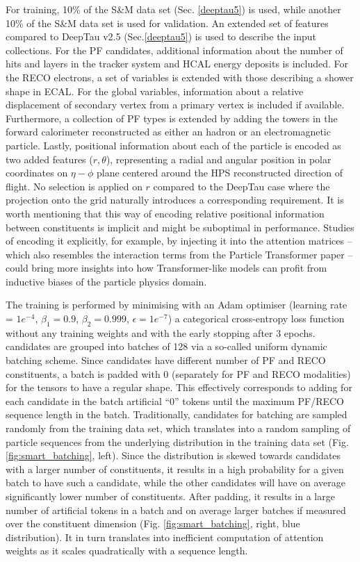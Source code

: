 For training, 10\% of the S\&M data set (Sec. \ref{deeptau5}) is used, while another 10\% of the S\&M data set is used for validation. An extended set of features compared to DeepTau v2.5 (Sec.\ref{deeptau5}) is used to describe the input collections. For the PF candidates, additional information about the number of hits and layers in the tracker system and HCAL energy deposits is included. For the RECO electrons, a set of variables is extended with those describing a shower shape in ECAL. For the global variables, information about a relative displacement of secondary vertex from a primary vertex is included if available.  Furthermore, a collection of PF types is extended by adding the towers in the forward calorimeter reconstructed as either an hadron or an electromagnetic particle. Lastly, positional information about each of the particle is encoded as two added features ($r, \theta$), representing a radial and angular position in polar coordinates on $\eta-\phi$ plane centered around the HPS reconstructed \tauh direction of flight. No selection is applied on $r$ compared to the DeepTau case where the projection onto the grid naturally introduces a corresponding requirement. It is worth mentioning that this way of encoding relative positional information between constituents is implicit and might be suboptimal in performance. Studies of encoding it explicitly, for example, by injecting it into the attention matrices \cite{chen2021demystifying}  -- which also resembles the interaction terms from the Particle Transformer paper -- could bring more insights into how Transformer-like models can profit from inductive biases of the particle physics domain.

The training is performed by minimising with an Adam optimiser (learning rate = $1e^{-4}$, $\beta_1=0.9$, $\beta_2=0.999$, $\epsilon=1e^{-7}$) a categorical cross-entropy loss function without any training weights and with the early stopping after 3 epochs. \tauh candidates are grouped into batches of 128 via a so-called uniform dynamic batching scheme. Since \tauh candidates have different number of PF and RECO constituents, a batch is padded with 0 (separately for PF and RECO modalities) for the tensors to have a regular shape. This effectively corresponds to adding for each \tauh candidate in the batch artificial \enquote{0} tokens until the maximum PF/RECO sequence length in the batch. Traditionally, \tauh candidates for batching are sampled randomly from the training data set, which translates into a random sampling of particle sequences from the underlying distribution in the training data set (Fig. \ref{fig:smart_batching}, left). Since the distribution is skewed towards \tauh candidates with a larger number of constituents, it results in a high probability for a given batch to have such a \tauh candidate, while the other \tauh candidates will have on average significantly lower number of constituents. After padding, it results in a large number of artificial tokens in a batch and on average larger batches if measured over the constituent dimension (Fig. \ref{fig:smart_batching}, right, blue distribution). It in turn translates into inefficient computation of attention weights as it scales quadratically with a sequence length. 

